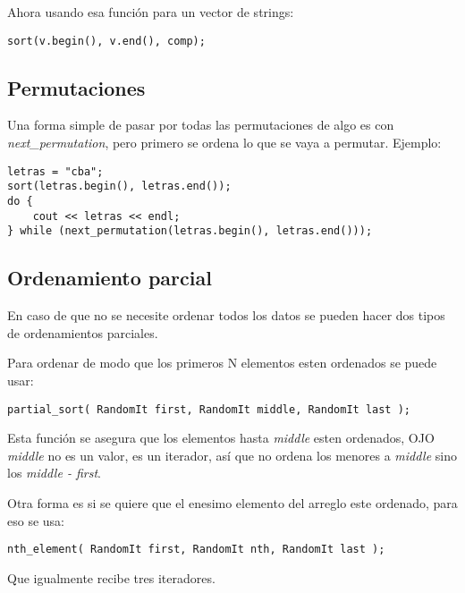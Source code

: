 \documentclass[11pt]{article}
\begin{document}
Ahora usando esa función para un vector de strings:

\begin{lstlisting}
sort(v.begin(), v.end(), comp);
\end{lstlisting}

\subsection{Permutaciones}

Una forma simple de pasar por todas las permutaciones de algo es con \textit{next\_permutation}, pero primero se ordena lo que se vaya a permutar. Ejemplo:

\begin{lstlisting}
letras = "cba";
sort(letras.begin(), letras.end());
do {
    cout << letras << endl;
} while (next_permutation(letras.begin(), letras.end()));
\end{lstlisting}

\subsection{Ordenamiento parcial}

En caso de que no se necesite ordenar todos los datos se pueden hacer dos tipos de ordenamientos parciales.

Para ordenar de modo que los primeros N elementos esten ordenados se puede usar:

\begin{lstlisting}
partial_sort( RandomIt first, RandomIt middle, RandomIt last );
\end{lstlisting}

Esta función se asegura que los elementos hasta \textit{middle} esten ordenados, OJO \textit{middle} no es un valor, es un iterador, así que no ordena los menores a \textit{middle} sino los \textit{middle - first}.

Otra forma es si se quiere que el enesimo elemento del arreglo este ordenado, para eso se usa:

\begin{lstlisting}
nth_element( RandomIt first, RandomIt nth, RandomIt last );
\end{lstlisting}

Que igualmente recibe tres iteradores.
\end{document}
